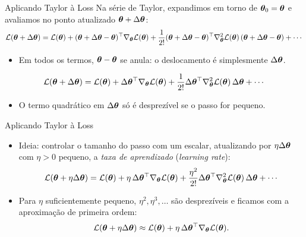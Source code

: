 \documentclass[aspectratio=169,xcolor=dvipsnames]{beamer}
\begin{document}
  \begin{frame}{Aplicando Taylor à Loss}
    Na série de Taylor, expandimos em torno de $\bm{\theta}_0=\bm{\theta}$ e avaliamos no ponto atualizado $\bm{\theta}+\Delta\bm{\theta}$:
    {\small
    \[
      \mathcal{L}(\bm{\theta}+\Delta\bm{\theta}) =
        \mathcal{L}(\bm{\theta})
        + (\bm{\theta}+\Delta\bm{\theta}-\bm{\theta})^\top\nabla_{\bm{\theta}}\mathcal{L}(\bm{\theta})
        + \frac{1}{2!}(\bm{\theta}+\Delta\bm{\theta}-\bm{\theta})^\top\nabla^{2}_{\bm{\theta}}\mathcal{L}(\bm{\theta})\,(\bm{\theta}+\Delta\bm{\theta}-\bm{\theta})
        + \cdots
    \]}
    \begin{itemize}
      \item Em todos os termos, $\bm{\theta}-\bm{\theta}$ se anula: o deslocamento é simplesmente $\Delta\bm{\theta}$.
    \end{itemize}
    \[
      \mathcal{L}(\bm{\theta}+\Delta\bm{\theta}) =
        \mathcal{L}(\bm{\theta})
        + \Delta\bm{\theta}^\top\nabla_{\bm{\theta}}\mathcal{L}(\bm{\theta})
        + \frac{1}{2!}\Delta\bm{\theta}^\top\nabla^{2}_{\bm{\theta}}\mathcal{L}(\bm{\theta})\,\Delta\bm{\theta}
        + \cdots
    \]
    \begin{itemize}
      \item O termo quadrático em $\Delta\bm{\theta}$ só é desprezível se o passo for \alert{pequeno}.
    \end{itemize}
  \end{frame}

  \begin{frame}{Aplicando Taylor à Loss}
    \begin{itemize}
      \item Ideia: controlar o tamanho do passo com um escalar, atualizando por $\eta \Delta\bm{\theta}$
        com $\eta>0$ pequeno, a \textit{taxa de aprendizado} (\textit{learning rate}):
        \[
          \mathcal{L}(\bm{\theta}+\eta \Delta\bm{\theta}) =
            \mathcal{L}(\bm{\theta})
            + \eta\,\Delta\bm{\theta}^\top\nabla_{\bm{\theta}}\mathcal{L}(\bm{\theta})
            + \frac{\eta^{2}}{2!}\Delta\bm{\theta}^\top\nabla^{2}_{\bm{\theta}}\mathcal{L}(\bm{\theta})\,\Delta\bm{\theta}
            + \cdots
        \]
      \item Para $\eta$ suficientemente pequeno, $\eta^{2},\eta^{3},\ldots$ são
        desprezíveis e ficamos com a aproximação de primeira ordem:
        \[
          \mathcal{L}(\bm{\theta}+\eta \Delta\bm{\theta})\approx \mathcal{L}(\bm{\theta}) + \eta\,\Delta\bm{\theta}^\top\nabla_{\bm{\theta}}\mathcal{L}(\bm{\theta}).
        \]
    \end{itemize}
  \end{frame}
\end{document}
